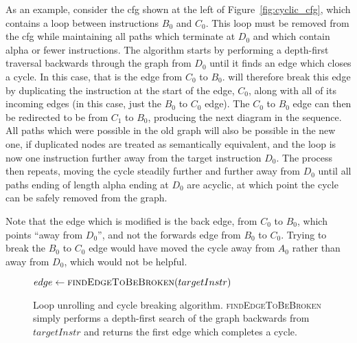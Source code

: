 As an example, consider the \gls{cfg} shown at the left of
Figure~\ref{fig:cyclic_cfg}, which contains a loop between
instructions $B_0$ and $C_0$.  This loop must be removed from the \gls{cfg}
while maintaining all paths which terminate at $D_0$ and which contain
\gls{alpha} or fewer instructions.  The algorithm starts by
performing a depth-first traversal backwards through the graph from
$D_0$ until it finds an edge which closes a cycle.  In this case, that
is the edge from $C_0$ to $B_0$.  {\Technique} will therefore break
this edge by duplicating the instruction at the start of the edge,
$C_0$, along with all of its incoming edges (in this case, just the
$B_0$ to $C_0$ edge).  The $C_0$ to $B_0$ edge can then be redirected
to be from $C_1$ to $B_0$, producing the next diagram in the sequence.
All paths which were possible in the old graph will also be possible
in the new one, if duplicated nodes are treated as semantically
equivalent, and the loop is now one instruction further away from the
target instruction $D_0$.  The process then repeats, moving the cycle
steadily further and further away from $D_0$ until all paths ending of
length \gls{alpha} ending at $D_0$ are acyclic, at which point
the cycle can be safely removed from the graph.

Note that the edge which is modified is the back edge, from $C_0$ to
$B_0$, which points ``away from $D_0$'', and not the forwards edge
from $B_0$ to $C_0$.  Trying to break the $B_0$ to $C_0$ edge would
have moved the cycle away from $A_0$ rather than away from $D_0$,
which would not be helpful.

\begin{figure}
\begin{algorithmic}[1]
     \State $edge \gets \textsc{findEdgeToBeBroken}(targetInstr)$
     \Else
        \EndFor
     \EndIf
  \EndWhile
\end{algorithmic}
\caption{Loop unrolling and cycle breaking algorithm.
  \textsc{findEdgeToBeBroken} simply performs a depth-first search of
  the graph backwards from $targetInstr$ and returns the first edge
  which completes a cycle.}
\label{fig:derive:read:unroll_cycle_break}
\end{figure}

